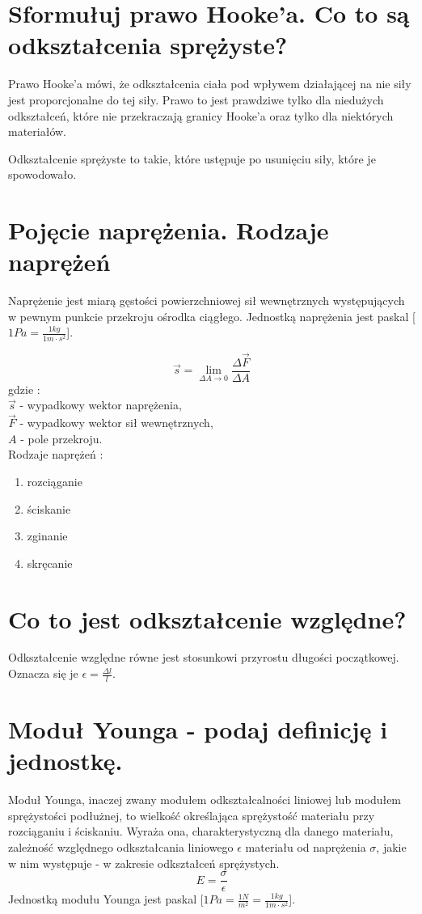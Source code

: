 \documentclass[a4paper,11pt]{article} %
\begin{document}
\section{Sformułuj prawo Hooke’a. Co to są odkształcenia sprężyste?}
Prawo Hooke'a mówi, że odkształcenia ciała pod wpływem działającej na nie siły jest proporcjonalne do tej siły. Prawo to jest prawdziwe tylko dla niedużych odkształceń, które nie przekraczają granicy Hooke'a oraz tylko dla niektórych materiałów. 

Odkształcenie sprężyste to takie, które ustępuje po usunięciu siły, które je spowodowało. 

\section{Pojęcie naprężenia. Rodzaje naprężeń}
Naprężenie jest miarą gęstości powierzchniowej sił wewnętrznych występujących w pewnym punkcie przekroju ośrodka ciągłego. Jednostką naprężenia jest paskal [$1 Pa = \frac{1 kg}{1m\cdot s^2}$].

$$\vec{s} = \lim_{\Delta A \rightarrow 0} \frac{\Delta \vec{F}}{\Delta A}$$ gdzie :\\
$\vec{s}$ - wypadkowy wektor naprężenia, \\
$\vec{F}$ - wypadkowy wektor sił wewnętrznych,\\
$A$ - pole przekroju.\\

Rodzaje naprężeń :
\begin{enumerate}
\item{rozciąganie}
\item{ściskanie}
\item{zginanie}
\item{skręcanie}
\end{enumerate}

\section{Co to jest odkształcenie względne?}
Odkształcenie względne równe jest stosunkowi przyrostu długości początkowej. Oznacza się je $\epsilon = \frac{\Delta l}{l}$.

\section{Moduł Younga - podaj definicję i jednostkę.} 
Moduł Younga, inaczej zwany modułem odkształcalności liniowej lub modułem sprężystości podłużnej, to wielkość określająca sprężystość materiału przy rozciąganiu i ściskaniu. Wyraża ona, charakterystyczną dla danego materiału, zależność względnego odkształcania liniowego $\epsilon$ materiału od naprężenia $\sigma$, jakie w nim występuje - w zakresie odkształceń sprężystych. 
$$ E = \frac{\sigma}{\epsilon}$$
Jednostką modułu Younga jest paskal [$1 Pa = \frac{1N}{m^2} = \frac{1 kg}{1m\cdot s^2}$]. 
\end{document}
